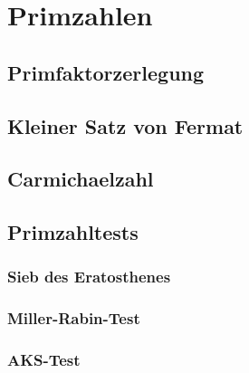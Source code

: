 \section{Primzahlen}
	\subsection{Primfaktorzerlegung}
	\subsection{Kleiner Satz von Fermat}
	\subsection{Carmichaelzahl}
	\subsection{Primzahltests}
		\subsubsection{Sieb des Eratosthenes}
		\subsubsection{Miller-Rabin-Test}
		\subsubsection{AKS-Test}